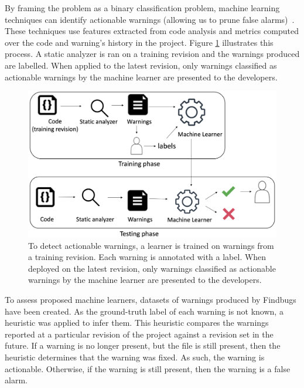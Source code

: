 By framing the problem as a binary classification problem, 
  machine learning techniques can identify actionable warnings 
  (allowing us to prune false alarms)~\cite{hanam2014finding,heckman2008establishing,liang2010automatic,ruthruff2008predicting,wang2018there,yang2021learning,yang2021understanding}.
These techniques use features extracted from code analysis and metrics computed over the code and warning's history in the project.
Figure \ref{fig:workflow} illustrates this process. 
A static analyzer is ran on a training revision and the warnings produced are labelled. 
When applied to the latest revision, only warnings classified as actionable warnings by the machine learner are presented to the developers.

\begin{figure}[t]
  
  \includegraphics[width=\columnwidth]{hongjin/workflow.png}
  \caption{To detect actionable warnings, a   learner is trained   on warnings from a training revision. Each warning is annotated with a label. When deployed on the latest revision, only warnings classified as actionable warnings by the machine learner are presented to the developers. }
      \label{fig:workflow}
  \centering
  \end{figure}

To assess proposed machine learners, datasets of warnings produced by Findbugs have been created.
As the ground-truth label of each warning is not known, a heuristic was applied to infer them.
This heuristic compares the warnings reported at a particular revision of the project against a revision set in the future.
If a warning is no longer present, but the file is still present, then the heuristic determines that the warning was fixed. 
As such, the warning is actionable.
Otherwise, if the warning is still present, then the warning is a false alarm.


